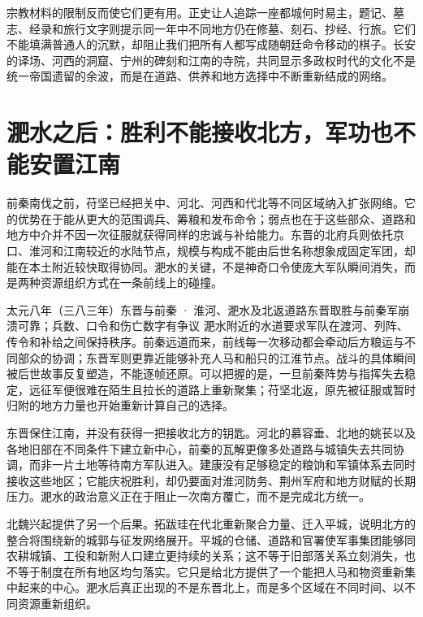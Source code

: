 宗教材料的限制反而使它们更有用。正史让人追踪一座都城何时易主，题记、墓志、经录和旅行文字则提示同一年中不同地方仍在修墓、刻石、抄经、行旅。它们不能填满普通人的沉默，却阻止我们把所有人都写成随朝廷命令移动的棋子。长安的译场、河西的洞窟、宁州的碑刻和江南的寺院，共同显示多政权时代的文化不是统一帝国遗留的余波，而是在道路、供养和地方选择中不断重新结成的网络。

\section{淝水之后：胜利不能接收北方，军功也不能安置江南}
\label{sec:eastern-jin-depth-fei-liuyu}

前秦南伐之前，苻坚已经把关中、河北、河西和代北等不同区域纳入扩张网络。它的优势在于能从更大的范围调兵、筹粮和发布命令；弱点也在于这些部众、道路和地方中介并不因一次征服就获得同样的忠诚与补给能力。东晋的北府兵则依托京口、淮河和江南较近的水陆节点，规模与构成不能由后世名称想象成固定军团，却能在本土附近较快取得协同。淝水的关键，不是神奇口令使庞大军队瞬间消失，而是两种资源组织方式在一条前线上的碰撞。

\begin{event}{}{太元八年（三八三年）}{东晋与前秦 · 淮河、淝水及北返道路}{东晋取胜与前秦军崩溃可靠；兵数、口令和伤亡数字有争议}
淝水附近的水道要求军队在渡河、列阵、传令和补给之间保持秩序。前秦远道而来，前线每一次移动都会牵动后方粮运与不同部众的协调；东晋军则更靠近能够补充人马和船只的江淮节点。战斗的具体瞬间被后世故事反复塑造，不能逐帧还原。可以把握的是，一旦前秦阵势与指挥失去稳定，远征军便很难在陌生且拉长的道路上重新聚集；苻坚北返，原先被征服或暂时归附的地方力量也开始重新计算自己的选择。

东晋保住江南，并没有获得一把接收北方的钥匙。河北的慕容垂、北地的姚苌以及各地旧部在不同条件下建立新中心，前秦的瓦解更像多处道路与城镇失去共同协调，而非一片土地等待南方军队进入。建康没有足够稳定的粮饷和军镇体系去同时接收这些地区；它能庆祝胜利，却仍要面对淮河防务、荆州军府和地方财赋的长期压力。淝水的政治意义正在于阻止一次南方覆亡，而不是完成北方统一。
\end{event}

北魏兴起提供了另一个后果。拓跋珪在代北重新聚合力量、迁入平城，说明北方的整合将围绕新的城郭与征发网络展开。平城的仓储、道路和官署使军事集团能够同农耕城镇、工役和新附人口建立更持续的关系；这不等于旧部落关系立刻消失，也不等于制度在所有地区均匀落实。它只是给北方提供了一个能把人马和物资重新集中起来的中心。淝水后真正出现的不是东晋北上，而是多个区域在不同时间、以不同资源重新组织。

